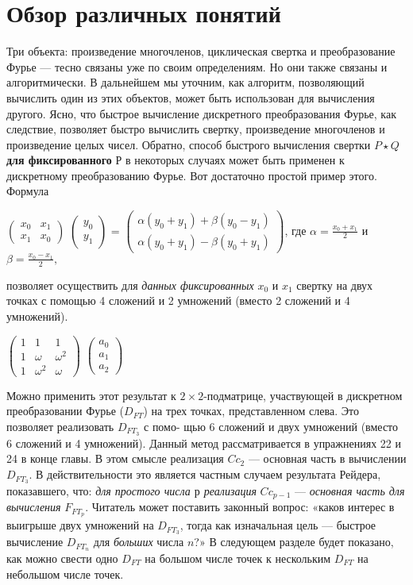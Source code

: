 \documentclass{mai_book}
\begin{document}
\section{Обзор различных понятий}
Три объекта: произведение многочленов, циклическая свертка и 
преобразование Фурье — тесно связаны уже по своим определениям. Но
они также связаны и алгоритмически. В дальнейшем мы уточним, как
алгоритм, позволяющий вычислить один из этих объектов, может быть
использован для вычисления другого. Ясно, что быстрое вычисление
дискретного преобразования Фурье, как следствие, позволяет быстро
вычислить свертку, произведение многочленов и произведение целых
чисел. Обратно, способ быстрого вычисления свертки $P \star Q$ \textbf{
для 
фиксированного} $Р$ в некоторых случаях может быть применен к 
дискретному преобразованию Фурье. Вот достаточно простой пример этого.\\
Формула
\begin{flushleft}
$\begin{pmatrix}
x_0 & x_1 \\
x_1 & x_0 
\end{pmatrix}$
$\begin{pmatrix}
y_0 \\
y_1
\end{pmatrix}$ = 
$\begin{pmatrix}
\alpha(y_0 + y_1) + \beta(y_0 - y_1) \\
\alpha(y_0 + y_1) - \beta(y_0 + y_1)
\end{pmatrix}$,
где $\alpha=\frac{x_0 + x_1}{2}$ и $\beta=\frac{x_0 - x_1}{2},$
\end{flushleft}
позволяет осуществить для \textit{данных фиксированных} $x_0$ и $x_1$ свертку на
двух точках с помощью 4 сложений и 2 умножений (вместо 2 сложений
и 4 умножений).
\begin{flushleft}
$\begin{pmatrix}
1 & 1 & 1\\
1 & \omega & \omega^2 \\
1 &  \omega^2 & \omega
\end{pmatrix}$
$\begin{pmatrix}
a_0\\
a_1\\
a_2
\end{pmatrix}$
\end{flushleft}
Можно применить этот результат к $2 \times 2$-подматрице,
участвующей в дискретном преобразовании
Фурье ($D_{FT}$) на трех точках, представленном
слева. Это позволяет реализовать $D_{FT_3}$ с помо-
щью 6 сложений и двух умножений (вместо 6
сложений и 4 умножений). Данный метод 
рассматривается в упражнениях 22 и 24 в конце главы. В этом смысле 
реализация $Cc_2$ — основная часть в вычислении $D_{FT_3}$. В действительности
это является частным случаем результата Рейдера, показавшего, что:
\textit{для простого числа $р$ реализация} $Cc_{p-1}$ — \textit{основная часть для 
вычисления} $F_{FT_p}$.
Читатель может поставить законный вопрос: «каков интерес в 
выигрыше двух умножений на $D_{FT_3}$, тогда как изначальная цель — 
быстрое вычисление $D_{FT_n}$ для \textit{больших} числа $n$?» В следующем разделе
будет показано, как можно свести одно $D_{FT}$ на большом числе точек к
нескольким $D_{FT}$ на небольшом числе точек.
\end{document}
